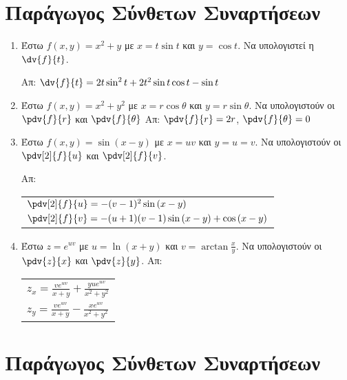 \documentclass[a4paper,table]{report}
\begin{document}
\begin{center}
\end{center} 


\section*{Παράγωγος Σύνθετων Συναρτήσεων}

\begin{enumerate}
    \item Έστω $ f(x,y) = x^{2}+y $ με $ x = t \sin{t} $ και $ y = \cos{t} $. 
        Να υπολογιστεί η $ \dv{f}{t} $. 

        \hfill Απ: $ \dv{f}{t} = 2t \sin^{2}{t} + 2t^{2} \sin{t} \cos{t} - \sin{t} $ 

    \item  Έστω $ f(x,y) = x^{2}+y^{2} $ με $ x = r \cos{\theta} $ και 
        $ y = r \sin{\theta} $. Να υπολογιστούν οι $ \pdv{f}{r} $ και 
        $ \pdv{f}{\theta} $
        \hfill Απ: $ \pdv{f}{r} = 2r $, $ \pdv{f}{\theta} = 0 $  

    \item Έστω $ f(x,y) = \sin{(x-y)} $ με $ x = uv $ και $ y = u=v $. Να 
        υπολογιστούν οι $ \pdv[2]{f}{u} $ και $ \pdv[2]{f}{v} $.

        \hfill Απ: \begin{tabular}{l}
            $ \pdv[2]{f}{u} = -(v-1)^{2} \sin{(x-y)} $ \\
            $ \pdv[2]{f}{v} = -(u+1)(v-1) \sin{(x-y)} + \cos{(x-y)} $
        \end{tabular}

    \item Έστω $ z = e^{uv} $ με $ u = \ln{(x+y)} $ και $ v = \arctan{\frac{x}{y}
        } $. Να υπολογιστούν οι $ \pdv{z}{x} $ και $ \pdv{z}{y} $. 
        \hfill Απ: \begin{tabular}{l}
            $ z_{x} = \frac{ve^{uv}}{x+y} + \frac{yue^{uv}}{x^{2}+y^{2}} $ \\
            $ z_{y} = \frac{ve^{uv}}{x+y} - \frac{xe^{uv}}{x^{2}+y^{2}} $
        \end{tabular}
\end{enumerate}


\section*{Παράγωγος Σύνθετων Συναρτήσεων} 
\end{document}
